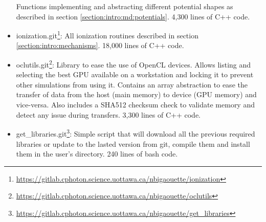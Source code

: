 \begin{itemize}
    Functions implementing and abstracting different potential shapes as
    described in section \ref{section:intro:md:potentials}. 4,300 lines of C++ code.
\item ionization.git\footnote{ \url{
    https://gitlab.cphoton.science.uottawa.ca/nbigaouette/ionization}}:
    All ionization routines described in section
    \ref{section:intro:mechanisms}. 18,000 lines of C++ code.
\item oclutils.git\footnote{ \url{
    https://gitlab.cphoton.science.uottawa.ca/nbigaouette/oclutils}}:
    Library to ease the use of OpenCL devices. Allows listing and selecting the
    best GPU available on a workstation and locking it to prevent
    other simulations from using it. Contains an array abstraction to ease the
    transfer of data from the host (main memory) to device (GPU memory) and
    vice-versa. Also includes a SHA512 checksum check to validate memory
    and detect any issue during transfers. 3,300 lines of C++ code.
\item get\_libraries.git\footnote{ \url{
    https://gitlab.cphoton.science.uottawa.ca/nbigaouette/get_libraries}}:
    Simple script that will download all the previous required libraries or
    update to the lasted version from git, compile them and install them in the
    user's directory. 240 lines of bash code.
\end{itemize}

